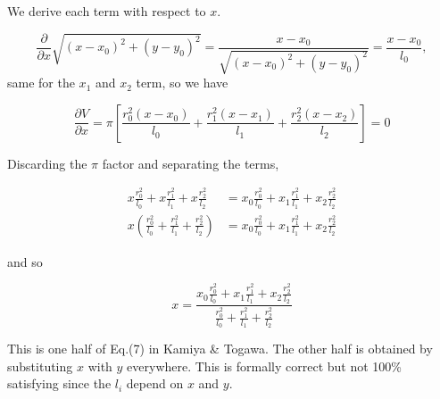\documentclass[a4paper, 11pt]{article} %
\newcommand{\sqlen}[1]{\ensuremath{(x - x_{#1})^2 + (y-y_{#1})^2}}
\newcommand{\rili}[1]{\ensuremath{\frac{r_{#1}^2}{l_{#1}}}}
\begin{document}
\begin{appendix}
We derive each term with respect to $x$.

\begin{equation*}
\frac{\partial}{\partial x} \sqrt{\sqlen{0}} = \frac{x-x_0}{\sqrt{\sqlen{0}}} = \frac{x-x_0}{l_0},
\end{equation*}
same for the $x_1$ and $x_2$ term, so we have

\begin{equation*}
\frac{\partial V}{\partial x} = \pi\left[ \frac{r_0^2(x-x_0)}{l_0} + \frac{r_1^2(x-x_1)}{l_1} + \frac{r_2^2(x-x_2)}{l_2}\right] = 0
\end{equation*}

Discarding the $\pi$ factor and separating the terms,

\begin{align*}
x\rili{0} + x\rili{1} + x\rili{2} &= x_0\rili{0} + x_1\rili{1} + x_2\rili{2} \\
x(\rili{0} + \rili{1} + \rili{2}) &= x_0\rili{0} + x_1\rili{1} + x_2\rili{2} 
\end{align*}

and so

\begin{equation*}
x = \frac{x_0\rili{0} + x_1\rili{1} + x_2\rili{2}}{\rili{0} + \rili{1} + \rili{2}}
\end{equation*}

This is one half of Eq.(7) in Kamiya \& Togawa. The other half is obtained by substituting $x$ with $y$ everywhere. This is
formally correct but not 100\% satisfying since the $l_i$ depend on $x$ and $y$.

\end{appendix}






\end{document}
